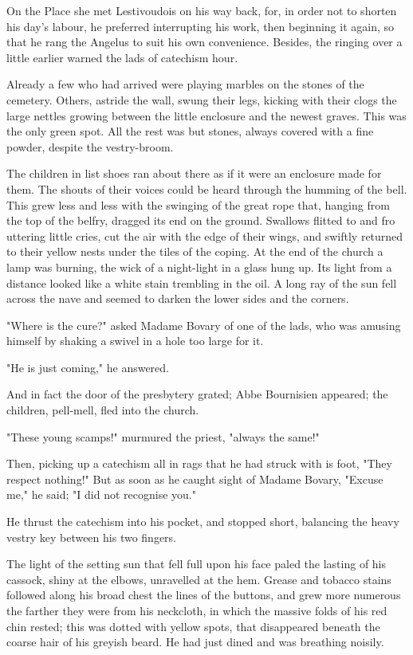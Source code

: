 \documentclass[11pt,twocolumn]{ltugboat}
\begin{document}
On the Place she met Lestivoudois on his way back, for, in order not
to shorten his day's labour, he preferred interrupting his work,
then beginning it again, so that he rang the Angelus to suit his own
convenience. Besides, the ringing over a little earlier warned the lads
of catechism hour.

Already a few who had arrived were playing marbles on the stones of the
cemetery. Others, astride the wall, swung their legs, kicking with their
clogs the large nettles growing between the little enclosure and the
newest graves. This was the only green spot. All the rest was but
stones, always covered with a fine powder, despite the vestry-broom.

The children in list shoes ran about there as if it were an enclosure
made for them. The shouts of their voices could be heard through the
humming of the bell. This grew less and less with the swinging of the
great rope that, hanging from the top of the belfry, dragged its end on
the ground. Swallows flitted to and fro uttering little cries, cut the
air with the edge of their wings, and swiftly returned to their yellow
nests under the tiles of the coping. At the end of the church a lamp was
burning, the wick of a night-light in a glass hung up. Its light from a
distance looked like a white stain trembling in the oil. A long ray of
the sun fell across the nave and seemed to darken the lower sides and
the corners.

"Where is the cure?" asked Madame Bovary of one of the lads, who was
amusing himself by shaking a swivel in a hole too large for it.

"He is just coming," he answered.

And in fact the door of the presbytery grated; Abbe Bournisien appeared;
the children, pell-mell, fled into the church.

"These young scamps!" murmured the priest, "always the same!"

Then, picking up a catechism all in rags that he had struck with is
foot, "They respect nothing!" But as soon as he caught sight of Madame
Bovary, "Excuse me," he said; "I did not recognise you."

He thrust the catechism into his pocket, and stopped short, balancing
the heavy vestry key between his two fingers.

The light of the setting sun that fell full upon his face paled the
lasting of his cassock, shiny at the elbows, unravelled at the hem.
Grease and tobacco stains followed along his broad chest the lines
of the buttons, and grew more numerous the farther they were from his
neckcloth, in which the massive folds of his red chin rested; this was
dotted with yellow spots, that disappeared beneath the coarse hair of
his greyish beard. He had just dined and was breathing noisily.
\end{document}
